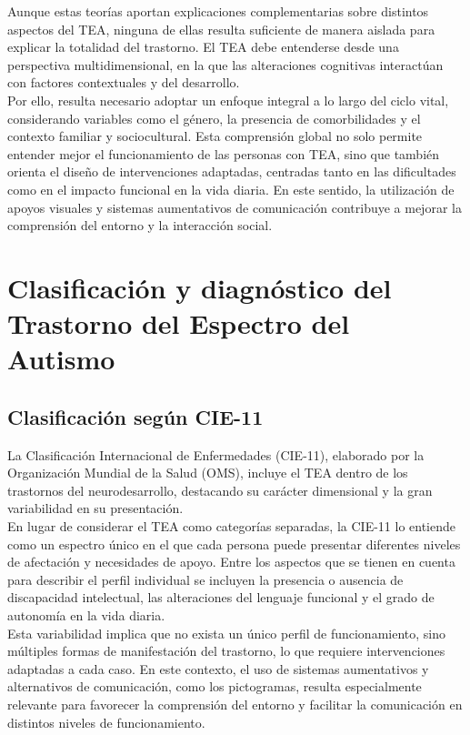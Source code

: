 \documentclass{article}
\begin{document}
Aunque estas teorías aportan explicaciones complementarias sobre distintos aspectos del TEA, ninguna de ellas resulta suficiente de manera aislada para explicar la totalidad del trastorno. El TEA debe entenderse desde una perspectiva multidimensional, en la que las alteraciones cognitivas interactúan con factores contextuales y del desarrollo.\\

Por ello, resulta necesario adoptar un enfoque integral a lo largo del ciclo vital, considerando variables como el género, la presencia de comorbilidades y el contexto familiar y sociocultural. Esta comprensión global no solo permite entender mejor el funcionamiento de las personas con TEA, sino que también orienta el diseño de intervenciones adaptadas, centradas tanto en las dificultades como en el impacto funcional en la vida diaria. En este sentido, la utilización de apoyos visuales y sistemas aumentativos de comunicación contribuye a mejorar la comprensión del entorno y la interacción social.


\section{\textbf{Clasificación y diagnóstico del Trastorno del Espectro del Autismo}}
\subsection{\textbf{Clasificación según CIE-11}}
La Clasificación Internacional de Enfermedades (CIE-11), elaborado por la Organización Mundial de la Salud (OMS), incluye el TEA dentro de los trastornos del neurodesarrollo, destacando su carácter dimensional y la gran variabilidad en su presentación.\\

En lugar de considerar el TEA como categorías separadas, la CIE-11 lo entiende como un espectro único en el que cada persona puede presentar diferentes niveles de afectación y necesidades de apoyo. Entre los aspectos que se tienen en cuenta para describir el perfil individual se incluyen la presencia o ausencia de discapacidad intelectual, las alteraciones del lenguaje funcional y el grado de autonomía en la vida diaria.\\

Esta variabilidad implica que no exista un único perfil de funcionamiento, sino múltiples formas de manifestación del trastorno, lo que requiere intervenciones adaptadas a cada caso. En este contexto, el uso de sistemas aumentativos y alternativos de comunicación, como los pictogramas, resulta especialmente relevante para favorecer la comprensión del entorno y facilitar la comunicación en distintos niveles de funcionamiento.
\end{document}
